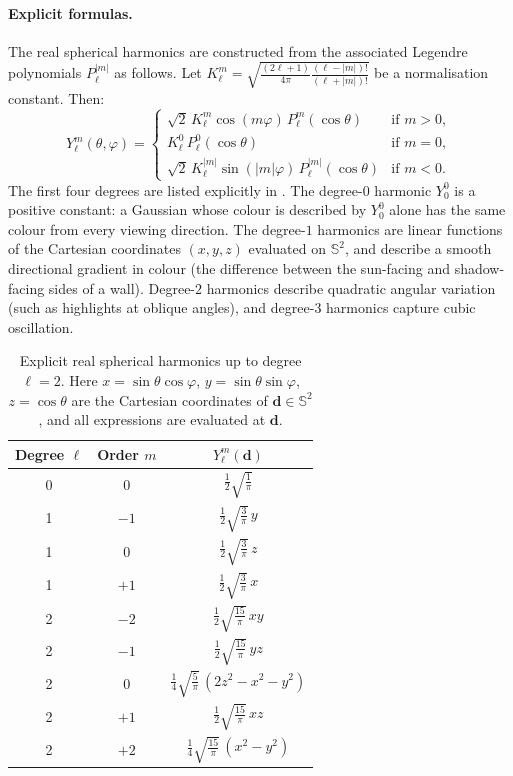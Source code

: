 \documentclass[11pt,a4paper]{article}
\theoremstyle{plain}
\theoremstyle{definition}
\theoremstyle{remark}
\begin{document}
\paragraph{Explicit formulas.}
The real spherical harmonics are constructed from the associated
Legendre polynomials $P_\ell^{|m|}$ as follows. Let
$K_\ell^m = \sqrt{\frac{(2\ell+1)}{4\pi}\frac{(\ell-|m|)!}{(\ell+|m|)!}}$
be a normalisation constant. Then:
\[
  Y_\ell^m(\theta,\varphi) =
  \begin{cases}
    \sqrt{2}\,K_\ell^m \cos(m\varphi)\,P_\ell^m(\cos\theta)
      & \text{if } m > 0, \\
    K_\ell^0 \,P_\ell^0(\cos\theta)
      & \text{if } m = 0, \\
    \sqrt{2}\,K_\ell^{|m|} \sin(|m|\varphi)\,P_\ell^{|m|}(\cos\theta)
      & \text{if } m < 0.
  \end{cases}
\]
The first four degrees are listed explicitly in
. The degree-$0$ harmonic $Y_0^0$ is a
positive constant: a Gaussian whose colour is described by
$Y_0^0$ alone has the same colour from every viewing direction.
The degree-$1$ harmonics are linear functions of the Cartesian
coordinates $(x, y, z)$ evaluated on $\mathbb{S}^2$, and describe
a smooth directional gradient in colour (the difference between the
sun-facing and shadow-facing sides of a wall). Degree-$2$ harmonics
describe quadratic angular variation (such as highlights at oblique
angles), and degree-$3$ harmonics capture cubic oscillation.

\begin{table}[h]
\centering
\small
\caption{Explicit real spherical harmonics up to degree $\ell = 2$.
Here $x = \sin\theta\cos\varphi$, $y = \sin\theta\sin\varphi$,
$z = \cos\theta$ are the Cartesian coordinates of $\mathbf{d}
\in \mathbb{S}^2$, and all expressions are evaluated at
$\mathbf{d}$.}
\label{tab:sh_explicit}
\begin{tabular}{@{}ccc@{}}
\toprule
Degree $\ell$ & Order $m$ & $Y_\ell^m(\mathbf{d})$ \\
\midrule
0 & 0    & $\tfrac{1}{2}\sqrt{\tfrac{1}{\pi}}$ \\[4pt]
1 & $-1$ & $\tfrac{1}{2}\sqrt{\tfrac{3}{\pi}}\,y$ \\[2pt]
1 & $0$  & $\tfrac{1}{2}\sqrt{\tfrac{3}{\pi}}\,z$ \\[2pt]
1 & $+1$ & $\tfrac{1}{2}\sqrt{\tfrac{3}{\pi}}\,x$ \\[4pt]
2 & $-2$ & $\tfrac{1}{2}\sqrt{\tfrac{15}{\pi}}\,xy$ \\[2pt]
2 & $-1$ & $\tfrac{1}{2}\sqrt{\tfrac{15}{\pi}}\,yz$ \\[2pt]
2 & $0$  & $\tfrac{1}{4}\sqrt{\tfrac{5}{\pi}}\,(2z^2 - x^2 - y^2)$ \\[2pt]
2 & $+1$ & $\tfrac{1}{2}\sqrt{\tfrac{15}{\pi}}\,xz$ \\[2pt]
2 & $+2$ & $\tfrac{1}{4}\sqrt{\tfrac{15}{\pi}}\,(x^2 - y^2)$ \\
\bottomrule
\end{tabular}
\end{table}
\end{document}
